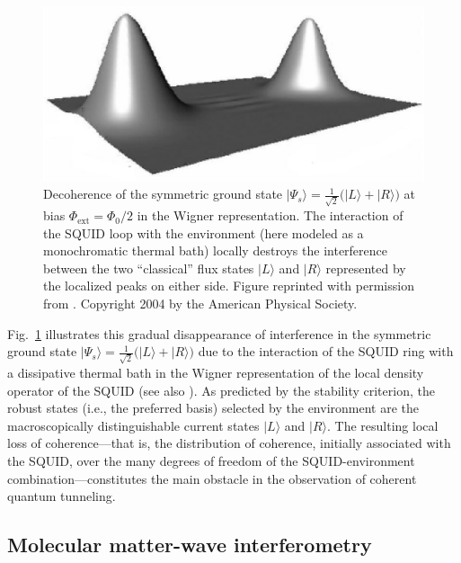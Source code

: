 \documentclass[twocolumn,aps,floatfix,amsmath,amssymb,showpacs,nofootinbib]{revtex4}
\newcommand{\ket}[1]{\ensuremath{|{#1\rangle}}}
\begin{document}
\begin{figure}
\begin{center}
 \includegraphics[scale=.2]{squid-dec5-n.eps}
\end{center}
\caption[Decoherence of the symmetric
ground state $\ket{\Psi_s} = \frac{1}{\sqrt{2}} \bigl( \ket{L} +
\ket{R} \bigr)$ at bias $\Phi_\text{ext} = \Phi_0/2$ in a
SQUID]{\label{fig:squid-dec}Decoherence of the symmetric ground state
  $\ket{\Psi_s} = \frac{1}{\sqrt{2}} \bigl( \ket{L} + \ket{R} \bigr)$
  at bias $\Phi_\text{ext} = \Phi_0/2$ in the Wigner representation.
  The interaction of the SQUID loop with the environment (here modeled
  as a monochromatic thermal bath) locally destroys the interference
  between the two ``classical'' flux states $\ket{L}$ and $\ket{R}$
  represented by the localized peaks on either side. Figure reprinted
  with permission from \cite{Everitt:2004:mb}. Copyright
  2004 by the American Physical Society.  }
\end{figure}


Fig.~\ref{fig:squid-dec} illustrates this gradual disappearance of
interference in the symmetric ground state $\ket{\Psi_s} =
\frac{1}{\sqrt{2}} \bigl( \ket{L} + \ket{R} \bigr)$ due to the
interaction of the SQUID ring with a dissipative thermal bath in the
Wigner representation of the local density operator of the SQUID
\cite{Everitt:2004:mb} (see also \cite{Chudnovsky:2003:un}). As
predicted by the stability criterion, the robust states (i.e., the
preferred basis) selected by the environment are the macroscopically
distinguishable current states $\ket{L}$ and $\ket{R}$. The resulting
local loss of coherence---that is, the distribution of coherence,
initially associated with the SQUID, over the many degrees of freedom
of the SQUID-environment combination---constitutes the main obstacle
in the observation of coherent quantum tunneling.


\subsection{Molecular matter-wave interferometry} \label{sec:mol-interference}
\end{document}
